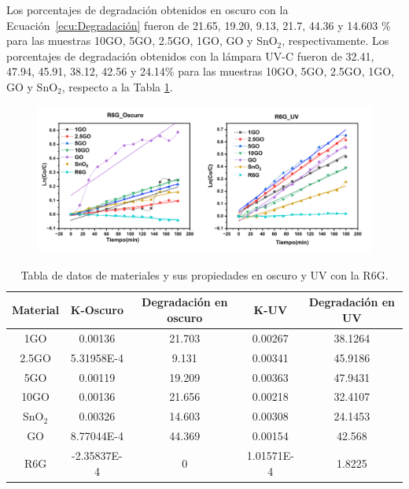 \documentclass[12pt]{article}
\begin{document}
Los porcentajes de degradación obtenidos en oscuro con la Ecuación~\ref{ecu:Degradación} fueron de 21.65, 19.20, 9.13, 21.7, 44.36 y 14.603 \% para las muestras 10GO, 5GO, 2.5GO, 1GO, GO y SnO$\displaystyle _{2}$, respectivamente.
Los porcentajes de degradación obtenidos con la lámpara UV-C fueron de 32.41, 47.94, 45.91, 38.12, 42.56 y 24.14\% para las muestras 10GO, 5GO, 2.5GO, 1GO, GO y SnO$\displaystyle _{2}$, respecto a la Tabla \ref{tab:tabla_SnO2_AM_R6G}. 
\begin{figure}[H]
    	   \begin{center}
     	  	\includegraphics[width = 1\textwidth]{Imagenes/R6G/R6G_OSC_UV.png}
    	   \end{center} 
        \end{figure}

\begin{table}[h]
\caption{Tabla de datos de materiales y sus propiedades en oscuro y UV con la R6G.}
\centering
\begin{tabular}{|c|c|c|c|c|}
\hline
Material & K-Oscuro & Degradación en oscuro & K-UV & Degradación en UV\\
\hline
1GO & 0.00136 & 21.703 & 0.00267  & 38.1264\\
\hline
2.5GO & 5.31958E-4 & 9.131 & 0.00341 & 45.9186\\
\hline
5GO & 0.00119 & 19.209 & 0.00363 & 47.9431\\
\hline
10GO & 0.00136 & 21.656 & 0.00218 & 32.4107\\
\hline
SnO$_{2}$ & 0.00326 & 14.603 & 0.00308 & 24.1453\\
\hline
GO & 8.77044E-4 & 44.369 & 0.00154 & 42.568\\
\hline
R6G & -2.35837E-4 & 0 & 1.01571E-4 & 1.8225\\
\hline
\end{tabular}
\label{tab:tabla_SnO2_AM_R6G}
\end{table}
\end{document}
